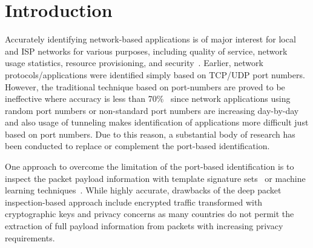 \documentclass[conference]{IEEEtran}
\begin{document}




%



\section{Introduction}

Accurately identifying network-based applications is of major interest for local and ISP networks for various purposes, including
quality of service, network usage statistics, resource provisioning, and security~\cite{Bernaille:2006:EAI:1368436.1368445, DBLP:conf/iwcmc/GrimaudoMB12, DBLP:conf/infocom/XieIKFN12}.
Earlier, network protocols/applications were identified simply based on TCP/UDP port numbers.
However, the traditional technique based on port-numbers are proved to be ineffective where accuracy is less than 70\%~\cite{ACAS} since network applications using random port numbers or non-standard port numbers are increasing day-by-day and also usage of tunneling makes identification of applications more difficult just based on port numbers.
Due to this reason, a substantial body of research has been conducted to replace or complement the port-based identification.

One approach to overcome the limitation of the port-based identification is to inspect the packet payload information with template signature sets~\cite{conf/IEEEcit/YeXWP09,DBLP:conf/noms/ParkWKH08} or machine learning techniques~\cite{ACAS}.
While highly accurate,  drawbacks of the deep packet inspection-based approach include encrypted traffic transformed with cryptographic keys and privacy concerns as many countries do not permit the extraction of full payload information from packets with increasing privacy requirements.
\end{document}
